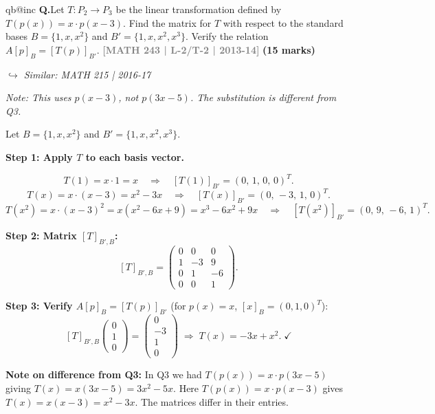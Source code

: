\documentclass[12pt,a3paper]{article}
\makeatletter
\newcommand{\yr}[1]{\hfill\textcolor{gray}{\small\textbf{[#1]}}}
\newcommand{\mk}[1]{\textcolor{orange!70!black}{\small\textbf{(#1 marks)}}}
\newcommand{\variant}[1]{\par\vspace{1pt}\textcolor{blue!50!black}%
  {\footnotesize\textit{$\hookrightarrow$ Similar: #1}}}
\newcounter{qnum}
\newcommand{\Q}[1]{%
  \csname qb@inc\endcsname
  \needspace{4\baselineskip}
  \refstepcounter{qnum}
  \vspace{6pt}
  \noindent\textbf{Q\theqnum.}\enspace #1\par
}
\makeatother
\begin{document}
\Q{Let $T: P_2 \to P_3$ be the linear transformation defined by $T(p(x)) = x \cdot p(x-3)$. Find the matrix for $T$ with respect to the standard bases $B = \{1, x, x^2\}$ and $B' = \{1, x, x^2, x^3\}$. Verify the relation $A[p]_B = [T(p)]_{B'}$.
\yr{MATH 243 | L-2/T-2 | 2013-14} \mk{15}
\variant{MATH 215 | 2016-17}}

\begin{tcolorbox}[enhanced,breakable,
  colback=cF!4,colframe=cF,boxrule=0.8pt,arc=5pt,
  title={\textbf{Answer --- $T:P_2\to P_3$, $T(p(x))=x\cdot p(x-3)$: Matrix \& Verification}},
  fonttitle=\bfseries\color{white},colbacktitle=cF]

\textit{Note: This uses $p(x-3)$, not $p(3x-5)$. The substitution is different from Q3.}

Let $B=\{1,x,x^2\}$ and $B'=\{1,x,x^2,x^3\}$.

\textbf{Step 1: Apply $T$ to each basis vector.}

\[
T(1)=x\cdot 1=x\quad\Rightarrow\quad[T(1)]_{B'}=(0,\,1,\,0,\,0)^T.
\]
\[
T(x)=x\cdot(x-3)=x^2-3x\quad\Rightarrow\quad[T(x)]_{B'}=(0,\,-3,\,1,\,0)^T.
\]
\[
T(x^2)=x\cdot(x-3)^2=x(x^2-6x+9)=x^3-6x^2+9x\quad\Rightarrow\quad[T(x^2)]_{B'}=(0,\,9,\,-6,\,1)^T.
\]

\textbf{Step 2: Matrix $[T]_{B',B}$:}
\[
[T]_{B',B}=\begin{pmatrix}0&0&0\\1&-3&9\\0&1&-6\\0&0&1\end{pmatrix}.
\]

\textbf{Step 3: Verify $A[p]_B=[T(p)]_{B'}$} (for $p(x)=x$, $[x]_B=(0,1,0)^T$):
\[
[T]_{B',B}\begin{pmatrix}0\\1\\0\end{pmatrix}=\begin{pmatrix}0\\-3\\1\\0\end{pmatrix}
\;\Rightarrow\; T(x)=-3x+x^2.\;\checkmark
\]

\textbf{Note on difference from Q3:} In Q3 we had $T(p(x))=x\cdot p(3x-5)$ giving $T(x)=x(3x-5)=3x^2-5x$. Here $T(p(x))=x\cdot p(x-3)$ gives $T(x)=x(x-3)=x^2-3x$. The matrices differ in their entries.

\end{tcolorbox}
\end{document}
